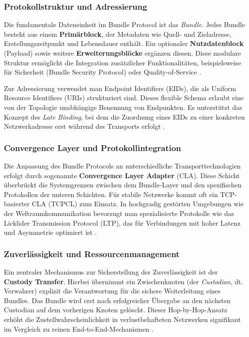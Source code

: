 \documentclass[paper=a4,fontsize=12pt,ngerman]{scrartcl}
\begin{document}
\subsubsection{Protokollstruktur und Adressierung}

Die fundamentale Dateneinheit im Bundle Protocol ist das \textit{Bundle}. 
Jedes Bundle besteht aus einem \textbf{Primärblock}, der Metadaten wie Quell- und Zieladresse, Erstellungszeitpunkt und Lebensdauer enthält. 
Ein optionaler \textbf{Nutzdatenblock} (Payload) sowie weitere \textbf{Erweiterungsblöcke} ergänzen diesen. 
Diese modulare Struktur ermöglicht die Integration zusätzlicher Funktionalitäten, beispielsweise für Sicherheit (Bundle Security Protocol) oder Quality-of-Service \cite[S. 11-12]{ScBu07}.

Zur Adressierung verwendet man Endpoint Identifiers (EIDs), die als Uniform Resource Identifiers (URIs) strukturiert sind. 
Dieses flexible Schema erlaubt eine von der Topologie unabhängige Benennung von Endpunkten. 
Es unterstützt das Konzept des \textit{Late Binding}, bei dem die Zuordnung eines EIDs zu einer konkreten Netzwerkadresse erst während des Transports erfolgt \cite[S. 7-9]{CBH+07}.

\subsubsection{Convergence Layer und Protokollintegration}

Die Anpassung des Bundle Protocols an unterschiedliche Transporttechnologien erfolgt durch sogenannte \textbf{Convergence Layer Adapter} (CLA). 
Diese Schicht überbrückt die Systemgrenzen zwischen dem Bundle-Layer und den spezifischen Protokollen der unteren Schichten. 
Für stabile Netzwerke kommt oft ein TCP-basierter CLA (TCPCL) zum Einsatz. 
In hochgradig gestörten Umgebungen wie der Weltraumkommunikation bevorzugt man spezialisierte Protokolle wie das Licklider Transmission Protocol (LTP), das für Verbindungen mit hoher Latenz und Asymmetrie optimiert ist \cite [S. 3]{WaWa25}.

\subsubsection{Zuverlässigkeit und Ressourcenmanagement}

Ein zentraler Mechanismus zur Sicherstellung der Zuverlässigkeit ist der \textbf{Custody Transfer}. 
Hierbei übernimmt ein Zwischenknoten (der \textit{Custodian}, dt. Verwahrer) explizit die Verantwortung für die sichere Weiterleitung eines Bundles. 
Das Bundle wird erst nach erfolgreicher Übergabe an den nächsten Custodian auf dem vorherigen Knoten gelöscht. 
Dieser Hop-by-Hop-Ansatz erhöht die Zustellwahrscheinlichkeit in verlustbehafteten Netzwerken signifikant im Vergleich zu reinen End-to-End-Mechanismen \cite{CBH+07}.
\end{document}
